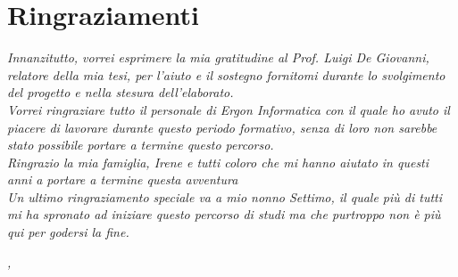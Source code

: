 
\cleardoublepage
{}
{}



\bigskip

\begingroup
\let\clearpage\relax
\let\cleardoublepage\relax
\let\cleardoublepage\relax

\chapter*{Ringraziamenti}

\noindent \textit{Innanzitutto, vorrei esprimere la mia gratitudine al Prof. Luigi De Giovanni, relatore della mia tesi, per l'aiuto e il sostegno fornitomi durante lo svolgimento del progetto e nella stesura dell'elaborato.}\\

\noindent \textit{Vorrei ringraziare tutto il personale di Ergon Informatica con il quale ho avuto il piacere di lavorare durante questo periodo formativo, senza di loro non 
sarebbe stato possibile portare a termine questo percorso.}\\

\noindent \textit{Ringrazio la mia famiglia, Irene e tutti coloro che mi hanno aiutato in questi anni a portare a termine questa avventura}\\

\noindent \textit{Un ultimo ringraziamento speciale va a mio nonno Settimo, il quale più di tutti mi ha spronato ad iniziare questo percorso di studi ma che purtroppo non è più qui 
per godersi la fine.}\\
\bigskip

\noindent\textit{\myLocation, \myTime}
\hfill \myName

\endgroup

